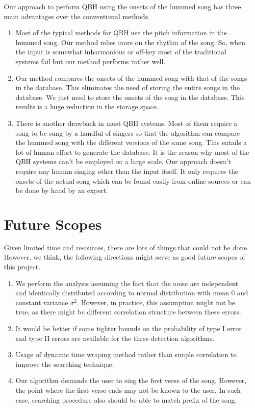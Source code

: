 \documentclass[10pt]{article}
\begin{document}
\qquad Our approach to perform QBH using the onsets of the hummed song has three main advantages over the conventional methods.
\begin{enumerate}
    \item Most of the typical methods for QBH use the pitch information in the hummed song. Our method relies more on the rhythm of the song. So, when the input is somewhat inharmonious or off-key most of the traditional systems fail but our method performs rather well.
    \item Our method compares the onsets of the hummed song with that of the songs in the database. This eliminates the need of storing the entire songs in the database. We just need to store the onsets of the song in the database. This results is a huge reduction in the storage space.
    \item There is another drawback in most QBH systems. Most of them require a song to be sung by a handful of singers so that the algorithm can compare the hummed song with the different versions of the same song. This entails a lot of human effort to generate the database. It is the reason why most of the QBH systems can't be employed on a large scale. Our approach doesn't require any human singing other than the input itself. It only requires the onsets of the actual song which can be found easily from online sources or can be done by hand by an expert.
\end{enumerate}

\section{Future Scopes}
\qquad Given limited time and resources, there are lots of things that could not be done. However, we think, the following directions might serve as good future scopes of this project.

\begin{enumerate}
    \item We perform the analysis assuming the fact that the noise are independent and identically distributed according to normal distribution with mean $0$ and constant variance $\sigma^2$. However, in practice, this assumption might not be true, as there might be different correlation structure between these errors.
    \item It would be better if some tighter bounds on the probability of type I error and type II errors are available for the three detection algorithms.
    \item Usage of dynamic time wraping method rather than simple correlation to improve the searching technique.
    \item Our algorithm demands the user to sing the first verse of the song. However, the point where the first verse ends may not be known to the user. In such case, searching procedure also should be able to match prefix of the song.
\end{enumerate}
\end{document}
